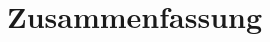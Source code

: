 \documentclass[10pt,a4paper]{article}
\begin{document}




\section{Zusammenfassung}
\end{document}
